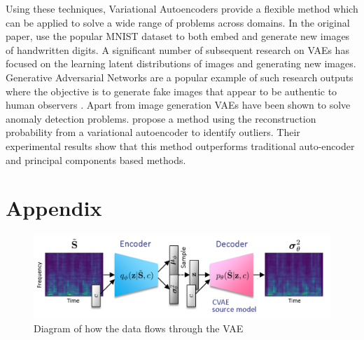 \documentclass[12pt]{extarticle}
\begin{document}
\noindent Using these techniques, Variational Autoencoders provide a flexible method which can be applied to solve a wide range of problems across domains. In the original paper,  \cite{vaeBayes} use the popular MNIST dataset to both embed and generate new images of handwritten digits. A significant number of subsequent research on VAEs has focused on the learning latent distributions of images and generating new images. Generative Adversarial Networks are a popular example of such research outputs where the objective is to generate fake images that appear to be authentic to human observers \citep{Goodfellow2014}.  \newline 
Apart from image generation VAEs have been shown to solve anomaly detection problems. \cite{An2015} propose a method using the reconstruction probability from a variational autoencoder to identify outliers. Their experimental results show that this method outperforms traditional auto-encoder and principal components based methods.



\newpage



\section*{Appendix}
\begin{figure}[htp]
     \centering
     \includegraphics[width=15cm]{VAE.png}
     \caption{Diagram of how the data flows through the VAE \cite{Kameoka2019}}
     \label{fig:diag}
\end{figure}
\end{document}
